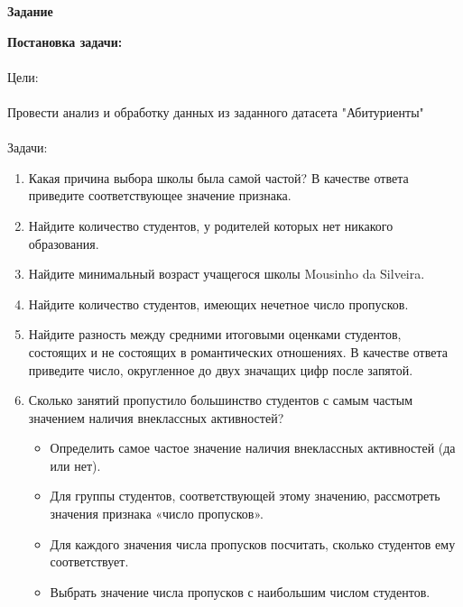 \documentclass[a4paper]{article}
\begin{document}
\newpage
\begin{center}
    \hfill \break
    \textbf{Задание}\\
\end{center}  
\normalsize{
    \textbf{Постановка задачи:}\\\\
    Цели:\\\\
    Провести анализ и обработку данных из заданного датасета "Абитуриенты"\\\\
    Задачи:\\
    \begin{enumerate}
        \item Какая причина выбора школы была самой частой? В качестве ответа приведите соответствующее значение признака.
        \item Найдите количество студентов, у родителей которых нет никакого образования.
        \item Найдите минимальный возраст учащегося школы Mousinho da Silveira.
        \item Найдите количество студентов, имеющих нечетное число пропусков.
        \item Найдите разность между средними итоговыми оценками студентов, состоящих и не состоящих в романтических отношениях. В качестве ответа приведите число, округленное до двух значащих цифр после запятой.
        \item Сколько занятий пропустило большинство студентов с самым частым значением наличия внеклассных активностей?
        \begin{itemize}
            \item Определить самое частое значение наличия внеклассных активностей (да или нет).
            \item Для группы студентов, соответствующей этому значению, рассмотреть значения признака «число пропусков».
            \item Для каждого значения числа пропусков посчитать, сколько студентов ему соответствует.
            \item Выбрать значение числа пропусков с наибольшим числом студентов.
        \end{itemize}
    \end{enumerate}
}

\end{document}
